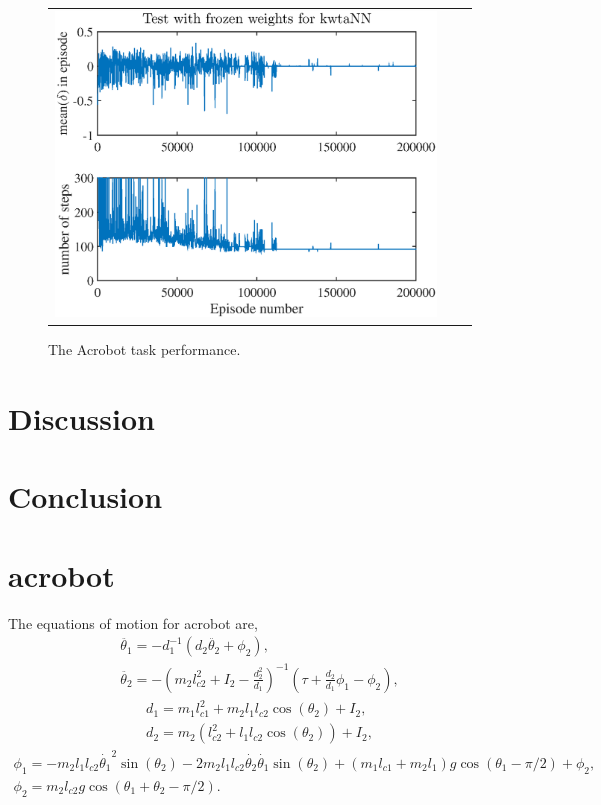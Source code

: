 \documentclass[preprint,12pt,authoryear]{elsarticle}
\begin{document}
\begin{figure}
\begin{center}
\begin{tabular}[h]{ccc}
\includegraphics[scale=0.2]{figures/acrobot-kwtaNN-frozen-test.eps} 
\end{tabular}
\end{center}
\caption{The Acrobot task performance.}
\label{bigresults}
\end{figure}


\section{Discussion}

\section{Conclusion}



 \appendix

 \section{acrobot}
 \label{appen:acrobot}
The equations of motion for acrobot are,
\begin{gather*}
\ddot{\theta_1} = -d_1^{-1} (d_2 \ddot{\theta_2} + \phi_2),\\
\ddot{\theta_2} = - \left( m_2 l^{2}_{c2} + I_2 - \frac{d^{2}_2}{d_1} \right)^{-1} \left( \tau + \frac{d_2}{d_1} \phi_1 - \phi_2 \right), 
\end{gather*}
\begin{gather*}
d_1 = m_1 l^{2}_{c1} + m_2 l_1 l_{c2} \cos(\theta_2) + I_2,  \\
d_2 = m_2 \left( l_{c2}^{2} + l_1 l_{c2} \cos(\theta_2) \right) + I_2, 
\end{gather*}
\begin{gather*}
\phi_1 = - m_2 l_1 l_{c2} \dot{\theta_1}^2 \sin(\theta_2) - 2 m_2 l_1 l_{c2} \dot{\theta_2} \dot{\theta_1}\sin(\theta_2) + (m_1 l_{c1} + m_2 l_{1})g \cos(\theta_1 - \pi / 2) + \phi_2,  \\
\phi_2 = m_2 l_{c2}g \cos(\theta_1 + \theta_2 - \pi / 2).
\end{gather*}
\end{document}
